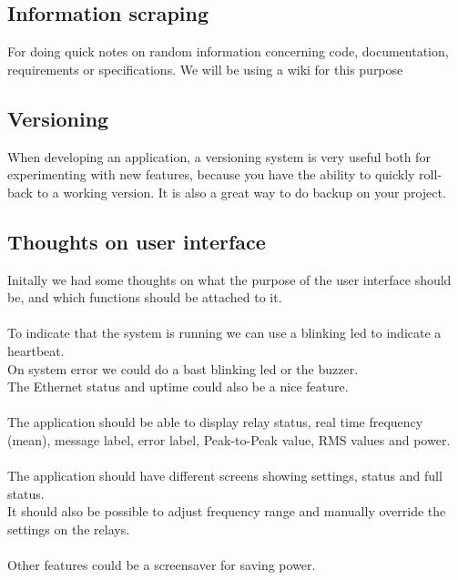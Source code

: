 \subsection{Information scraping}
For doing quick notes on random information concerning code, documentation, requirements or specifications. We will be using a wiki for this purpose

\subsection{Versioning}
When developing an application, a versioning system is very useful both for experimenting with new features, because you have the ability to quickly roll-back to a working version. It is also a great way to do backup on your project.

\subsection{Thoughts on user interface}
Initally we had some thoughts on what the purpose of the user interface should be, and which functions should be attached to it.\\\\
To indicate that the system is running we can use a blinking led to indicate a heartbeat.\\
On system error we could do a bast blinking led or the buzzer.\\
The Ethernet status and uptime could also be a nice feature.\\\\
The application should be able to display relay status, real time frequency (mean), message label, error label, Peak-to-Peak value, RMS values and power.\\\\
The application should have different screens showing settings, status and full status.\\
It should also be possible to adjust frequency range and manually override the settings on the relays.\\\\
Other features could be a screensaver for saving power.

